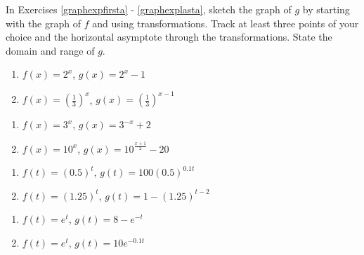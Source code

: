 \label{ExercisesforExponentialFunctions}



In Exercises \ref{graphexpfirsta} - \ref{graphexplasta}, sketch the graph of $g$ by starting with the graph of $f$ and using transformations.  Track at least three points of your choice and the horizontal asymptote through the transformations. State the domain and range of $g$.

\begin{multicols}{2}
\begin{enumerate}

\item  $f(x) = 2^{x}$, $g(x) = 2^{x} - 1$ \label{graphexpfirsta}

\item  $f(x) = \left(\frac{1}{3}\right)^{x}$, $g(x) = \left(\frac{1}{3}\right)^{x-1}$

\setcounter{HW}{\value{enumi}}
\end{enumerate}
\end{multicols}

\begin{multicols}{2}
\begin{enumerate}
\setcounter{enumi}{\value{HW}}

\item  $f(x) = 3^{x}$, $g(x) = 3^{-x}+2$

\item  $f(x) = 10^{x}$, $g(x) = 10^{\frac{x+1}{2}} - 20$  

\setcounter{HW}{\value{enumi}}
\end{enumerate}
\end{multicols}

\begin{multicols}{2}
\begin{enumerate}
\setcounter{enumi}{\value{HW}}

\item  $f(t) = (0.5)^{t}$, $g(t) = 100(0.5)^{0.1t}$

\item  $f(t) = (1.25)^{t}$, $g(t) = 1 - (1.25)^{t-2}$

\setcounter{HW}{\value{enumi}}
\end{enumerate}
\end{multicols}

\begin{multicols}{2}
\begin{enumerate}
\setcounter{enumi}{\value{HW}}

\item  $f(t) = e^{t}$, $g(t) = 8 - e^{-t}$

\item  $f(t) = e^{t}$, $g(t) = 10e^{-0.1t}$ \label{graphexplasta}

\setcounter{HW}{\value{enumi}}
\end{enumerate}
\end{multicols}

